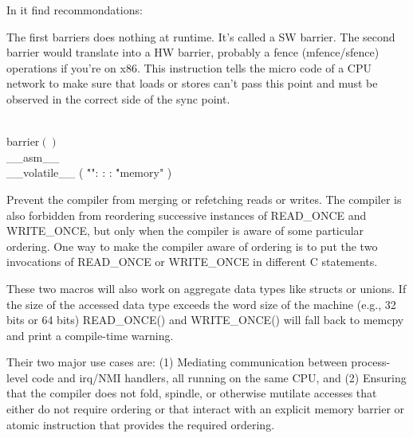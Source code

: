 \vskip 2pt\noindent
In it find recommondations:

\vskip 2pt\noindent
The first barriers does nothing at runtime. It\rq s called a SW barrier.
The second barrier would translate into a HW barrier, probably a fence
(mfence/sfence) operations if you\rq re on x86.
This instruction tells the micro code of a CPU network to make sure that
loads or stores can\rq t pass this point and must be observed in the correct
side of the sync point.

\Y\B\4\D\\{barrier}$()$\5
\\{\_\_asm\_\_}\\{\_\_volatile\_\_} ( \.{""}: : : \.{"memory"} )\par
\fi

Prevent the compiler from merging or refetching reads or writes. The
compiler is also forbidden from reordering successive instances of
READ\_ONCE and WRITE\_ONCE, but only when the compiler is aware of some
particular ordering. One way to make the compiler aware of ordering is to
put the two invocations of READ\_ONCE or WRITE\_ONCE in different C
statements.

\vskip 2pt\noindent
These two macros will also work on aggregate data types like structs or
unions. If the size of the accessed data type exceeds the word size of
the machine (e.g., 32 bits or 64 bits) READ\_ONCE() and WRITE\_ONCE() will
fall back to memcpy and print a compile-time warning.

\vskip 2pt\noindent
Their two major use cases are: (1) Mediating communication between
process-level code and irq/NMI handlers, all running on the same CPU,
and (2) Ensuring that the compiler does not fold, spindle, or otherwise
mutilate accesses that either do not require ordering or that interact
with an explicit memory barrier or atomic instruction that provides the
required ordering.

